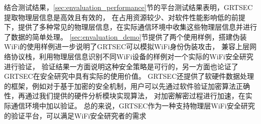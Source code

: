   结合测试结果，\ref{sec:envaluation_performance}节的平台测试结果表明，GRTSEC提取物理层信息是高效且有效的，
  在占用资源较少、对软件性能影响低的前提下，提供了多种常见的物理层信息，在实际通信环境中收集这些物理层信息并进行了数据的简单处理。
  \ref{sec:envaluation_demo}节提供了两个使用样例，搭建伪装WiFi的使用样例进一步说明了GRTSEC可以模拟WiFi身份伪装攻击，
  兼容上层网络协议栈，利用物理层信息识别不同WiFi设备的样例对一个实际的WiFi安全研究进行验证，
  验证结果一方面说明这种安全策略是可行的，另一方面也论证了GRTSEC在安全研究中具有实际的使用价值。
  GRTSEC还提供了软硬件数据处理的框架，例如对于基于加密的安全机制，用户可以先通过软件验证加密算法正确性，再通过我们提供的硬件分析模块实现算法，
  对加密解密过程进行加速，在实际通信环境中加以验证。
  总的来说，GRTSEC作为一种支持物理层WiFi安全研究的验证平台，可以满足WiFi安全研究者的需求

